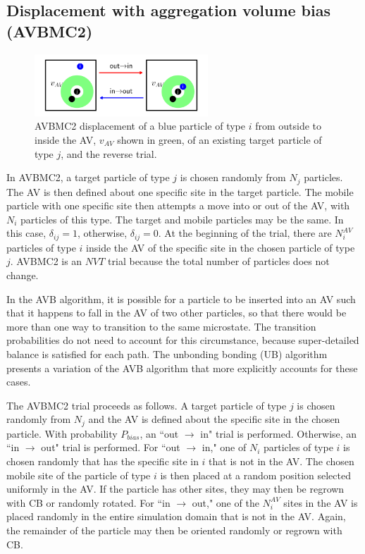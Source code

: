\documentclass[
  9pt,
  bestpractices,
  pubversion,
]{livecoms}
\begin{document}
\subsection{\label{sec:lhs_disp_avb2}Displacement with aggregation volume bias (AVBMC2)}

\begin{figure}
\begin{centering}
\includegraphics[width=6.5cm]{../figures/avb2.pdf}
\caption{
AVBMC2 displacement of a blue particle of type $i$ from outside to inside the AV, $v_{AV}$ shown in green, of an existing target particle of type $j$, and the reverse trial.
}
\label{fig:avbmc2}
\end{centering}
\end{figure}

In AVBMC2, a target particle of type $j$ is chosen randomly from $N_j$ particles.
The AV is then defined about one specific site in the target particle.
The mobile particle with one specific site then attempts a move into or out of the AV, with $N_i$ particles of this type.
The target and mobile particles may be the same.
In this case, $\delta_{ij}=1$, otherwise, $\delta_{ij}=0$.
At the beginning of the trial, there are $N_i^{AV}$ particles of type $i$ inside the AV of the specific site in the chosen particle of type $j$.
AVBMC2 is an $NVT$ trial because the total number of particles does not change.

In the AVB algorithm, it is possible for a particle to be inserted into an AV such that it happens to fall in the AV of two other particles, so that there would be more than one way to transition to the same microstate.
The transition probabilities do not need to account for this circumstance, because super-detailed balance is satisfied for each path.
The unbonding bonding (UB) algorithm \cite{wierzchowski_general-purpose_2001} presents a variation of the AVB algorithm that more explicitly accounts for these cases.

The AVBMC2 trial proceeds as follows.
A target particle of type $j$ is chosen randomly from $N_j$ and the AV is defined about the specific site in the chosen particle.
With probability $P_{bias}$, an ``out $\rightarrow$ in" trial is performed.
Otherwise, an ``in $\rightarrow$ out" trial is performed.
For ``out $\rightarrow$ in," one of $N_i$ particles of type $i$ is chosen randomly that has the specific site in $i$ that is not in the AV.
The chosen mobile site of the particle of type $i$ is then placed at a random position selected uniformly in the AV.
If the particle has other sites, they may then be regrown with CB or randomly rotated.
For ``in $\rightarrow$ out," one of the $N_i^{AV}$ sites in the AV is placed randomly in the entire simulation domain that is not in the AV.
Again, the remainder of the particle may then be oriented randomly or regrown with CB.
\end{document}
